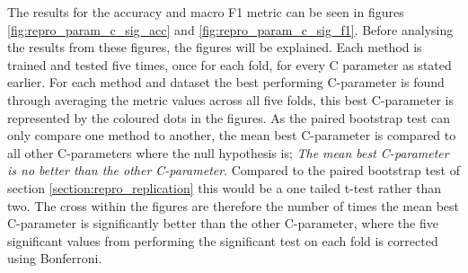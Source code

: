 The results for the accuracy and macro F1 metric can be seen in figures \ref{fig:repro_param_c_sig_acc} and \ref{fig:repro_param_c_sig_f1}. Before analysing the results from these figures, the figures will be explained. Each method is trained and tested five times, once for each fold, for every C parameter as stated earlier. For each method and dataset the best performing C-parameter is found through averaging the metric values across all five folds, this best C-parameter is represented by the coloured dots in the figures. As the paired bootstrap test can only compare one method to another, the mean best C-parameter is compared to all other C-parameters where the null hypothesis is;
\textit{The mean best C-parameter is no better than the other C-parameter}. Compared to the paired bootstrap test of section \ref{section:repro_replication} this would be a one tailed t-test rather than two. The cross within the figures are therefore the number of times the mean best C-parameter is significantly better than the other C-parameter, where the five significant values from performing the significant test on each fold is corrected using Bonferroni.

